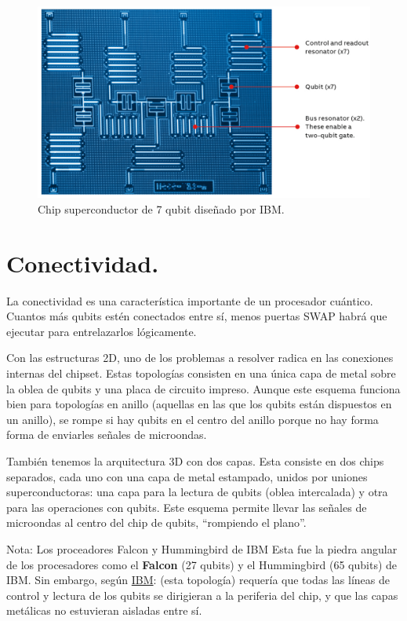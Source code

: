 \begin{figure}[t]
    \centering 
    \includegraphics[width=0.7\linewidth]{Figuras/Fig_scq_chip_7_qubits.png}
    \caption{Chip superconductor de 7 qubit diseñado por IBM.}
    \label{Fig_scq_chip_7_qubits}
\end{figure}




\newpage
\section{Conectividad.} \label{sec_scq_conectividad}

La conectividad es una característica importante de un procesador cuántico. Cuantos más qubits estén conectados entre sí, menos puertas SWAP habrá que ejecutar para entrelazarlos lógicamente.

Con las estructuras 2D, uno de los problemas a resolver radica en las conexiones internas del chipset. Estas topologías consisten en una única capa de metal sobre la oblea de qubits y una placa de circuito impreso. Aunque este esquema funciona bien para topologías en anillo (aquellas en las que los qubits están dispuestos en un anillo), se rompe si hay qubits en el centro del anillo porque no hay forma forma de enviarles señales de microondas. 

También tenemos la arquitectura 3D con dos capas. Esta consiste en dos chips separados, cada uno con una capa de metal estampado, unidos por uniones superconductoras: una capa para la lectura de qubits (oblea intercalada) y otra para las operaciones con qubits. Este esquema permite llevar las señales de microondas al centro del chip de qubits, ``rompiendo el plano''. 

\begin{mybox_blue}{Nota: Los proceadores Falcon y Hummingbird de IBM}
Esta fue la piedra angular de los procesadores como el \textbf{Falcon} (27 qubits) y el Hummingbird (65 qubits) de IBM. Sin embargo, según \href{https://www.ibm.com/quantum/blog/eagle-quantum-processor-performance}{IBM}: (esta topología) requería que todas las líneas de control y lectura de los qubits se dirigieran a la periferia del chip, y que las capas metálicas no estuvieran aisladas entre sí.

\end{mybox_blue}

